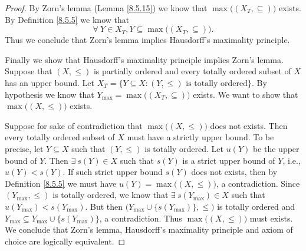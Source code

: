 \begin{proof}
    By Zorn's lemma (Lemma \ref{8.5.15}) we know that \(\max\big((X_T, \subseteq)\big)\) exists.
    By Definition \ref{8.5.5} we know that
    \[
        \forall\ Y \in X_T, Y \subseteq \max\big((X_T, \subseteq)\big).
    \]
    Thus we conclude that Zorn's lemma implies Hausdorff's maximality principle.

    Finally we show that Hausdorff's maximality principle implies Zorn's lemma.
    Suppose that \((X, \leq)\) is partially ordered and every totally ordered subset of \(X\) has an upper bound.
    Let \(X_T = \{Y \subseteq X : (Y, \leq) \text{ is totally ordered}\}\).
    By hypothesis we know that \(Y_{\max} = \max\big((X_T, \subseteq)\big)\) exists.
    We want to show that \(\max\big((X, \leq)\big)\) exists.

    Suppose for sake of contradiction that \(\max\big((X, \leq)\big)\) does not exists.
    Then every totally ordered subset of \(X\) must have a strictly upper bound.
    To be precise, let \(Y \subseteq X\) such that \((Y, \leq)\) is totally ordered.
    Let \(u(Y)\) be the upper bound of \(Y\).
    Then \(\exists\ s(Y) \in X\) such that \(s(Y)\) is a strict upper bound of \(Y\), i.e., \(u(Y) < s(Y)\).
    If such strict upper bound \(s(Y)\) does not exists, then by Definition \ref{8.5.5} we must have \(u(Y) = \max\big((X, \leq)\big)\), a contradiction.
    Since \((Y_{\max}, \leq)\) is totally ordered, we know that \(\exists\ s(Y_{\max}) \in X\) such that \(u(Y_{\max}) < s(Y_{\max})\).
    But then \(\big(Y_{\max} \cup \{s(Y_{\max})\}, \leq\big)\) is totally ordered and \(Y_{\max} \subseteq Y_{\max} \cup \{s(Y_{\max})\}\), a contradiction.
    Thus \(\max\big((X, \leq)\big)\) must exists.
    We conclude that Zorn's lemma, Hausdorff's maximality principle and axiom of choice are logically equivalent.
\end{proof}


